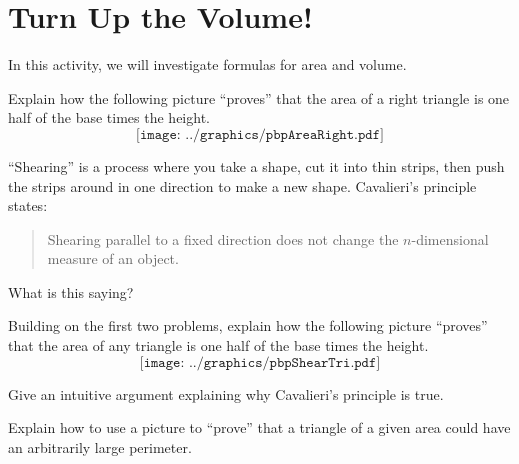\newpage
\section{Turn Up the Volume!}

In this activity, we will investigate formulas for area and
volume.


\begin{prob}
Explain how the following picture ``proves'' that the area of a right
  triangle is one half of the base times the height.
\[
\texttt{[image: ../graphics/pbpAreaRight.pdf]}
\]
\end{prob}


\begin{prob}
``Shearing'' is a process where you take a shape, cut it into thin strips, 
then push the strips around in one direction to make a new shape.  
Cavalieri's principle states:
\begin{quote}
Shearing parallel to a fixed direction does not change the
$n$-dimensional measure of an object.
\end{quote}
What is this saying?
\end{prob}




\begin{prob}
Building on the first two problems, explain how the following picture
  ``proves'' that the area of any triangle is one half of the base times the
  height.
\[
\texttt{[image: ../graphics/pbpShearTri.pdf]}
\]
\end{prob}




\begin{prob}
Give an intuitive argument explaining why Cavalieri's principle is
true.
\end{prob}


\begin{prob}
Explain how to use a picture to ``prove'' that a triangle of a given
  area could have an arbitrarily large perimeter.
\end{prob}


%
%
%

